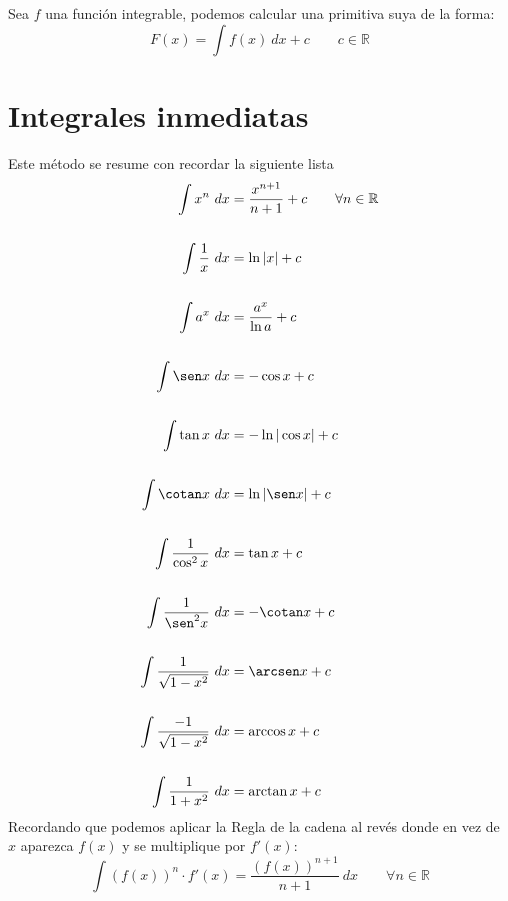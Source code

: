 \begin{prop}
    Sea $f$ una función integrable, podemos calcular una primitiva suya de la forma:
    \begin{equation*}
        F(x) = \int f(x)~dx + c \qquad c\in \mathbb{R}
    \end{equation*}
\end{prop}

\section{Integrales inmediatas}
Este método se resume con recordar la siguiente lista
\begin{align*}
        \displaystyle \int x^n~dx &= \frac{x^{n+1}}{n+1} + c \qquad \forall n\in \mathbb{R}\\
        \ \\
        \displaystyle \int \frac{1}{x}~dx &= \ln |x| + c \\
        \ \\
        \displaystyle\int a^x~dx  &= \dfrac{a^x}{\ln a} + c \\
        \ \\
        \displaystyle\int \sen x~dx  &= -\cos x + c \\
        \ \\
        \displaystyle\int \tan x~dx  &= -\ln |\cos x| + c \\
        \ \\
        \displaystyle\int \cotan x~dx  &= \ln|\sen x| + c \\
        \ \\
        \displaystyle\int \frac{1}{\cos^2 x}~dx  &= \tan x + c \\  
        \ \\
        \displaystyle\int \frac{1}{\sen^2 x}~dx &= -\cotan x + c \\
        \ \\
        \displaystyle \int \frac{1}{\sqrt{1-x^2}}~dx  &= \arcsen x + c \\
        \ \\
        \displaystyle \int \frac{-1}{\sqrt{1-x^2}}~dx  &= \arccos x + c \\
        \ \\
        \displaystyle \int \frac{1}{1+x^2}~dx  &= \arctan x + c
\end{align*}
Recordando que podemos aplicar la Regla de la cadena al revés donde en vez de $x$ aparezca $f(x)$ y se multiplique por $f'(x)$:
\begin{equation*}
    \displaystyle\int {(f(x))}^n \cdot f'(x) = \frac{{(f(x))}^{n+1}}{n+1}~dx \qquad \forall n\in \mathbb{R}
\end{equation*}

